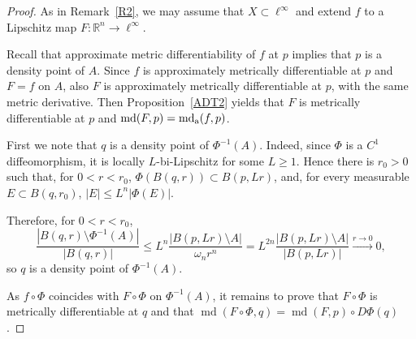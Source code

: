 \documentclass[12pt,leqno]{amsart}
\theoremstyle{definition}
\newcommand{\bbbr}{\mathbb R}
\def\H{{\mathcal H}}
\def\md{\operatorname{md}}
\def\apmd{\operatorname{md_{\rm a}}}
\numberwithin{theorem}{section} \numberwithin{equation}{section}
\begin{document}
\begin{proof}
As in Remark~\ref{R2}, we may assume that $X\subset \ell^\infty$ and
extend $f$ to a Lipschitz map $F:\bbbr^n\to \ell^\infty$.

Recall that approximate metric differentiability of $f$ at $p$ implies that $p$ is a density point of $A$. Since $f$ is approximately metrically differentiable at $p$ and $F=f$ on $A$, also $F$ is approximately metrically differentiable at $p$, with the same metric derivative. Then Proposition~\ref{ADT2} yields that $F$ is metrically differentiable at $p$ and $\md(F,p)=\apmd(f,p)$.

First we note that $q$ is a density point of $\Phi^{-1}(A)$. Indeed,
since $\Phi$ is a $C^1$ diffeomorphism, it is locally $L$-bi-Lipschitz for some $L\geq 1$. Hence there is $r_0>0$ such that, for $0<r<r_0$,
$\Phi(B(q,r))\subset B(p,Lr)$,
and, for every measurable $E\subset B(q,r_0)$,
$|E|\leq L^n |\Phi(E)|$.


Therefore, for $0<r<r_0$,
$$
\frac{|B(q,r)\setminus \Phi^{-1}(A)|}{|B(q,r)|}
\leq
L^n
\frac{|B(p,Lr)\setminus A|}{\omega_n r^n}
=
L^{2n}
\frac{|B(p,Lr)\setminus A|}{|B(p,Lr)|}\stackrel{r\to 0}{\longrightarrow} 0,
$$
so $q$ is a density point of $\Phi^{-1}(A)$.

As $f\circ \Phi$ coincides with $F\circ \Phi$ on $\Phi^{-1}(A)$,
it remains to prove that $F\circ \Phi$ is metrically differentiable at
$q$ and that $\md(F\circ\Phi,q)=\md(F,p)\circ D\Phi(q)$.


\end{proof}
\end{document}

